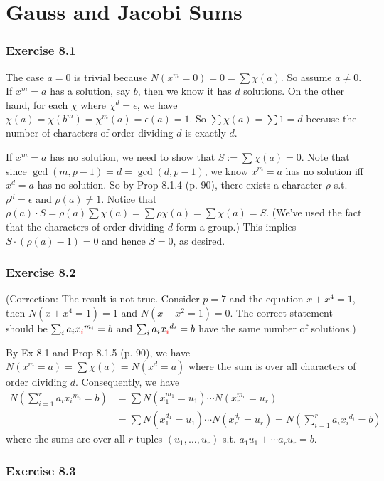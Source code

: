 \documentclass[../I&R.tex]{subfiles}
\begin{document}
\chapter{Gauss and Jacobi Sums}

\subsection*{Exercise 8.1}

The case $a=0$ is trivial because $N(x^m=0)=0=\sum \chi(a)$. So assume $a\neq 0$. If $x^m=a$ has a solution, say $b$, then we know it has $d$ solutions. On the other hand, for each $\chi$ where $\chi^d=\epsilon$, we have $\chi(a)=\chi(b^m)=\chi^m(a)=\epsilon(a)=1$. So $\sum\chi(a)=\sum 1=d$ because the number of characters of order dividing $d$ is exactly $d$.

If $x^m=a$ has no solution, we need to show that $S:=\sum\chi(a)=0$. Note that since $\gcd(m,p-1)=d=\gcd(d,p-1)$, we know $x^m=a$ has no solution iff $x^d=a$ has no solution. So by Prop 8.1.4 (p. 90), there exists a character $\rho$ s.t. $\rho^d=\epsilon$ and $\rho(a)\neq1$. Notice that $\rho(a)\cdot S=\rho(a)\sum\chi(a)=\sum\rho\chi(a)=\sum\chi(a)=S$. (We've used the fact that the characters of order dividing $d$ form a group.) This implies $S\cdot(\rho(a)-1)=0$ and hence $S=0$, as desired.

\subsection*{Exercise 8.2}

(Correction: The result is not true. Consider $p=7$ and the equation $x+x^4=1$, then $N(x+x^4=1)=1$ and $N(x+x^2=1)=0$. The correct statement should be $\sum_i a_ix_{\color{red}i}^{m_i}=b$ and $\sum_i a_ix_{\color{red}i}^{d_i}=b$ have the same number of solutions.)

By Ex 8.1 and Prop 8.1.5 (p. 90), we have $N(x^m=a)=\sum \chi(a)=N(x^d=a)$ where the sum is over all characters of order dividing $d$. Consequently, we have
\begin{align*}
N\left(\sum_{i=1}^r a_i{x_i}^{m_i}=b\right) &= \sum N(x_1^{m_1}=u_1)\cdots N(x_r^{m_r}=u_r) \\
&= \sum N(x_1^{d_1}=u_1)\cdots N(x_r^{d_r}=u_r) = N\left(\sum_{i=1}^r a_i{x_i}^{d_i}=b\right)
\end{align*}
where the sums are over all $r$-tuples $(u_1,\ldots,u_r)$ s.t. $a_1u_1+\cdots a_ru_r=b$.

\subsection*{Exercise 8.3}
\end{document}
